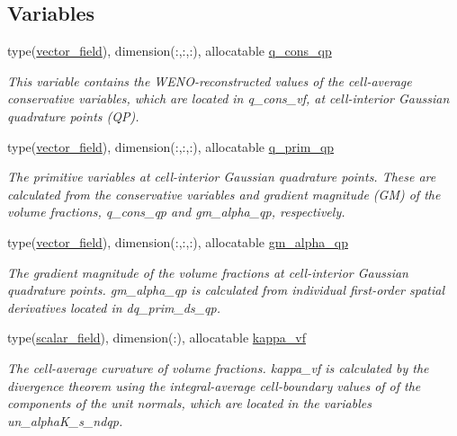 \subsection*{Variables}
\begin{DoxyCompactItemize}
\item 
type(\hyperlink{structm__derived__types_1_1vector__field}{vector\+\_\+field}), dimension(\+:,\+:,\+:), allocatable \hyperlink{namespacem__rhs_a646c5130e5b695e4eecf0e85a797ba7c}{q\+\_\+cons\+\_\+qp}
\begin{DoxyCompactList}\small\item\em This variable contains the W\+E\+N\+O-\/reconstructed values of the cell-\/average conservative variables, which are located in q\+\_\+cons\+\_\+vf, at cell-\/interior Gaussian quadrature points (QP). \end{DoxyCompactList}\item 
type(\hyperlink{structm__derived__types_1_1vector__field}{vector\+\_\+field}), dimension(\+:,\+:,\+:), allocatable \hyperlink{namespacem__rhs_af2af2a542d5af4fec546eda34af4ef74}{q\+\_\+prim\+\_\+qp}
\begin{DoxyCompactList}\small\item\em The primitive variables at cell-\/interior Gaussian quadrature points. These are calculated from the conservative variables and gradient magnitude (GM) of the volume fractions, q\+\_\+cons\+\_\+qp and gm\+\_\+alpha\+\_\+qp, respectively. \end{DoxyCompactList}\item 
type(\hyperlink{structm__derived__types_1_1vector__field}{vector\+\_\+field}), dimension(\+:,\+:,\+:), allocatable \hyperlink{namespacem__rhs_a1141883715f63c7b9d54dde459434fcc}{gm\+\_\+alpha\+\_\+qp}
\begin{DoxyCompactList}\small\item\em The gradient magnitude of the volume fractions at cell-\/interior Gaussian quadrature points. gm\+\_\+alpha\+\_\+qp is calculated from individual first-\/order spatial derivatives located in dq\+\_\+prim\+\_\+ds\+\_\+qp. \end{DoxyCompactList}\item 
type(\hyperlink{structm__derived__types_1_1scalar__field}{scalar\+\_\+field}), dimension(\+:), allocatable \hyperlink{namespacem__rhs_a33739bde53c5512b62c38b0575973897}{kappa\+\_\+vf}
\begin{DoxyCompactList}\small\item\em The cell-\/average curvature of volume fractions. kappa\+\_\+vf is calculated by the divergence theorem using the integral-\/average cell-\/boundary values of of the components of the unit normals, which are located in the variables un\+\_\+alpha\+K\+\_\+s\+\_\+ndqp. \end{DoxyCompactList}\item 

\end{DoxyCompactItemize}
